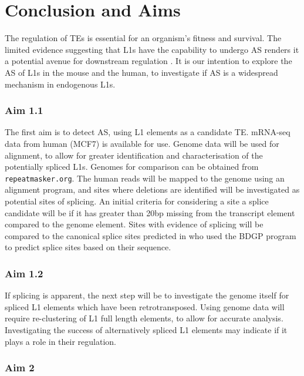 \documentclass[12pt]{article}
\begin{document}
	\section{Conclusion and Aims}
	
		The regulation of TEs is essential for an organism's fitness and survival.
		The limited evidence suggesting that L1s have the capability to undergo AS renders it a potential avenue for downstream regulation \citep{Belancio06}.
		It is our intention to explore the AS of L1s in the mouse and the human, to investigate if AS is a widespread mechanism in endogenous L1s. 
		
		\subsubsection*{Aim 1.1}
		
			The first aim is to detect AS, using L1 elements as a candidate TE.
			mRNA-seq data from human (MCF7) is available for use.
			Genome data will be used for alignment, to allow for greater identification and characterisation of the potentially spliced L1s.
			Genomes for comparison can be obtained from \texttt{repeatmasker.org}.
			The human reads will be mapped to the genome using an alignment program, and sites where deletions are identified will be investigated as potential sites of splicing.
			An initial criteria for considering a site a splice candidate will be if it has greater than 20bp missing from the transcript element compared to the genome element.
			Sites with evidence of splicing will be compared to the canonical splice sites predicted in \citep{Belancio06} who used the BDGP program to predict splice sites based on their sequence. 
		
		\subsubsection*{Aim 1.2}
				
			If splicing is apparent, the next step will be to investigate the genome itself for spliced L1 elements which have been retrotransposed.
			Using genome data will require re-clustering of L1 full length elements, to allow for accurate analysis.
			Investigating the success of alternatively spliced L1 elements may indicate if it plays a role in their regulation. 
		
		\subsubsection*{Aim 2}
\end{document}
